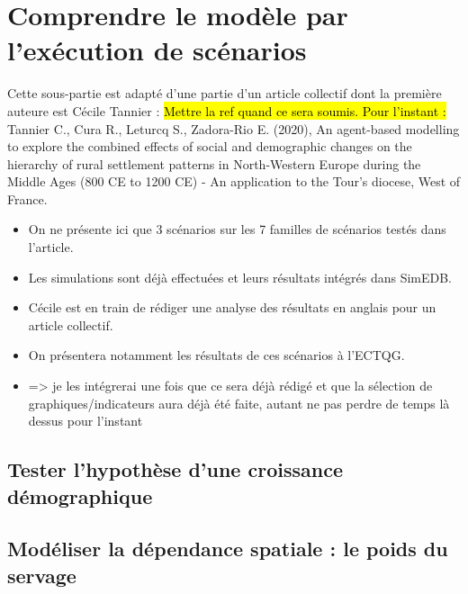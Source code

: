 \clearpage
\section[Exploration de scénarios]{Comprendre le modèle par l'exécution de scénarios%
	}\label{sec:scenarios}

\bigskip
\begin{mdframed}[backgroundcolor=black!5,footnoteinside=false]
	Cette sous-partie est adapté d'une partie d'un article collectif dont la première auteure est Cécile Tannier : \hl{Mettre la ref quand ce sera soumis. Pour l'instant :} \\
		 Tannier C., Cura R., Leturcq S., Zadora-Rio E. (2020), \og An agent-based modelling to explore the combined effects of social and demographic changes on the hierarchy of rural settlement patterns in North-Western Europe during the Middle Ages (800 CE to 1200 CE) - An application to the Tour's diocese, West of France\fg{}.
\end{mdframed}

\begin{itemize}
	\item On ne présente ici que 3 scénarios sur les 7 \og familles\fg{} de scénarios testés dans l'article.
	\item Les simulations sont déjà effectuées et leurs résultats intégrés dans SimEDB.
	\item Cécile est en train de rédiger une analyse des résultats en anglais pour un article collectif.
	\item On présentera notamment les résultats de ces scénarios à l'ECTQG.
	\item => je les intégrerai une fois que ce sera déjà rédigé et que la sélection de graphiques/indicateurs aura déjà été faite, autant ne pas perdre de temps là dessus pour l'instant
\end{itemize}

\subsection{Tester l'hypothèse d'une croissance démographique \label{subsec:scenario-croissance}}

\subsection{Modéliser la dépendance spatiale : le poids du servage \label{subsec:scenario-servage}}

